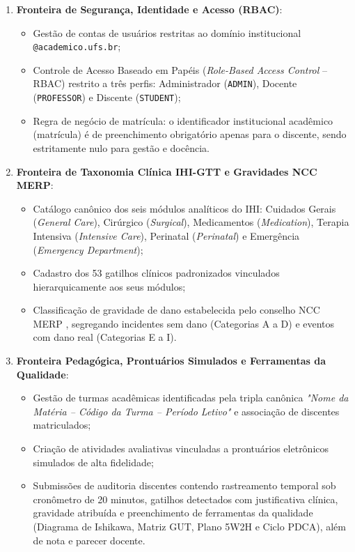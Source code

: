 \begin{enumerate}
    \item \textbf{Fronteira de Segurança, Identidade e Acesso (RBAC)}:
    \begin{itemize}
        \item Gestão de contas de usuários restritas ao domínio institucional \texttt{@academico.ufs.br};
        \item Controle de Acesso Baseado em Papéis (\textit{Role-Based Access Control} -- RBAC) restrito a três perfis: Administrador (\texttt{ADMIN}), Docente (\texttt{PROFESSOR}) e Discente (\texttt{STUDENT});
        \item Regra de negócio de matrícula: o identificador institucional acadêmico (matrícula) é de preenchimento obrigatório apenas para o discente, sendo estritamente nulo para gestão e docência.
    \end{itemize}

    \item \textbf{Fronteira de Taxonomia Clínica IHI-GTT e Gravidades NCC MERP}:
    \begin{itemize}
        \item Catálogo canônico dos seis módulos analíticos do IHI: Cuidados Gerais (\textit{General Care}), Cirúrgico (\textit{Surgical}), Medicamentos (\textit{Medication}), Terapia Intensiva (\textit{Intensive Care}), Perinatal (\textit{Perinatal}) e Emergência (\textit{Emergency Department});
        \item Cadastro dos 53 gatilhos clínicos padronizados vinculados hierarquicamente aos seus módulos;
        \item Classificação de gravidade de dano estabelecida pelo conselho NCC MERP \cite{nccmerp2001}, segregando incidentes sem dano (Categorias A a D) e eventos com dano real (Categorias E a I).
    \end{itemize}

    \item \textbf{Fronteira Pedagógica, Prontuários Simulados e Ferramentas da Qualidade}:
    \begin{itemize}
        \item Gestão de turmas acadêmicas identificadas pela tripla canônica \textit{"Nome da Matéria -- Código da Turma -- Período Letivo"} e associação de discentes matriculados;
        \item Criação de atividades avaliativas vinculadas a prontuários eletrônicos simulados de alta fidelidade;
        \item Submissões de auditoria discentes contendo rastreamento temporal sob cronômetro de 20 minutos, gatilhos detectados com justificativa clínica, gravidade atribuída e preenchimento de ferramentas da qualidade (Diagrama de Ishikawa, Matriz GUT, Plano 5W2H e Ciclo PDCA), além de nota e parecer docente.
    \end{itemize}
\end{enumerate}


